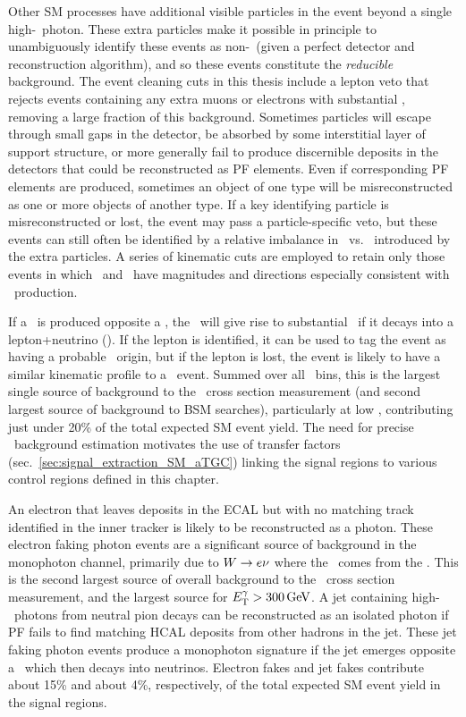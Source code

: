 Other SM processes have additional visible particles in the event beyond a single high-\pT\ photon. These extra particles make it possible in principle to unambiguously
identify these events as non-\zinvg\ (given a perfect detector and reconstruction algorithm), and so these events constitute the \textit{reducible} background.
The event cleaning cuts in this thesis include a lepton veto that rejects events containing any extra muons or electrons with substantial \pT,
removing a large fraction of this background.
Sometimes particles will escape through small gaps in the detector, be absorbed by some interstitial layer of support structure, or more generally fail to produce
discernible deposits in the detectors that could be reconstructed as PF elements. Even if corresponding PF elements are produced, sometimes an object of one type will
be misreconstructed as one or more objects of another type. If a key identifying particle is misreconstructed or lost, the event may pass a particle-specific veto, but these
events can still often be identified by a relative imbalance in \vecpTgamma\ vs. \vecMET\ introduced by the extra particles.
A series of kinematic cuts are employed to retain only those events in which \vecpTgamma\ and \vecMET\ have magnitudes and directions especially consistent with
\zinvg\ production.

If a \PW\ is produced opposite a \Pgamma, the \PW\ will give rise to substantial \MET\ if it decays into a lepton+neutrino (\wlng). If the lepton is identified, it can be used
to tag the event as having a probable \wlng\ origin, but if the lepton is lost, the event is likely to have a similar kinematic profile to
a \zinvg\ event. Summed over all \ETgamma\ bins, this is the largest single source of background to the \zinvg\ cross section measurement (and second largest source of background
to BSM searches), particularly at low \ETgamma, contributing just under 20\% of the total expected SM event yield.
The need for precise \wlng\ background estimation motivates the use of transfer factors (sec.~\ref{sec:signal_extraction_SM_aTGC}) linking the signal
regions to various control regions defined in this chapter.

An electron that leaves deposits
in the ECAL but with no matching track identified in the inner tracker is likely to be reconstructed as a photon. These electron faking photon events are a significant
source of background in the monophoton channel, primarily due to $\PW \to \Pe\Pn$ where the \MET\ comes from the \Pn. This is the second largest source of overall background to
the \zinvg\ cross section measurement, and the largest source for $\ETgamma > 300\unit{GeV}$. A jet containing high-\pT\ photons from neutral
pion decays can be reconstructed as an isolated photon if PF fails to find matching HCAL deposits from other hadrons in the jet. These jet faking photon events produce a monophoton
signature if the jet emerges opposite a \PZ\ which then decays into neutrinos. Electron fakes and jet fakes contribute about 15\% and about 4\%, respectively, of the total
expected SM event yield in the signal regions.

